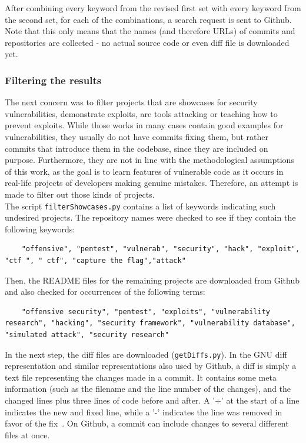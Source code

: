 \documentclass[
a4paper,
pagesize,
pdftex,
12pt,
twoside, %
BCOR=5mm, %
ngerman,
fleqn,
final,
]{scrartcl}
\begin{document}
	
	
	After combining every keyword from the revised first set with every keyword from the second set, for each of the combinations, a search request is sent to Github.
	Note that this only means that the names (and therefore URLs) of commits and repositories are collected - no actual source code or even diff file is downloaded yet.
	
	
	
	\subsubsection{Filtering the results}
	
	The next concern was to filter projects that are showcases for security vulnerabilities, demonstrate exploits, are tools attacking or teaching how to prevent exploits. While those works in many cases contain good examples for vulnerabilities, they usually do not have commits fixing them, but rather commits that introduce them in the codebase, since they are included on purpose. Furthermore, they are not in line with the methodological assumptions of this work, as the goal is to learn features of vulnerable code as it occurs in real-life projects of developers making genuine mistakes. Therefore, an attempt is made to filter out those kinds of projects.\\
	The script \texttt{filterShowcases.py} contains a list of keywords indicating such undesired projects. The repository names were checked to see if they contain the following keywords:
	\begin{lstlisting}
	"offensive", "pentest", "vulnerab", "security", "hack", "exploit", "ctf ", " ctf", "capture the flag","attack"
	\end{lstlisting}
	Then, the README files for the remaining projects are downloaded from Github and also checked for occurrences of the following terms:
	\begin{lstlisting}
	"offensive security", "pentest", "exploits", "vulnerability research", "hacking", "security framework", "vulnerability database", "simulated attack", "security research"
	\end{lstlisting}
	In the next step, the diff files are downloaded (\texttt{getDiffs.py}). In the GNU diff representation and similar representations also used by Github, a diff is simply a text file representing the changes made in a commit. It contains some meta information (such as the filename and the line number of the changes), and the changed lines plus three lines of code before and after. A '+' at the start of a line indicates the new and fixed line, while a '-' indicates the line was removed in favor of the fix~\cite{Liu.2018}. On Github, a commit can include changes to several different files at once.\\
\end{document}
